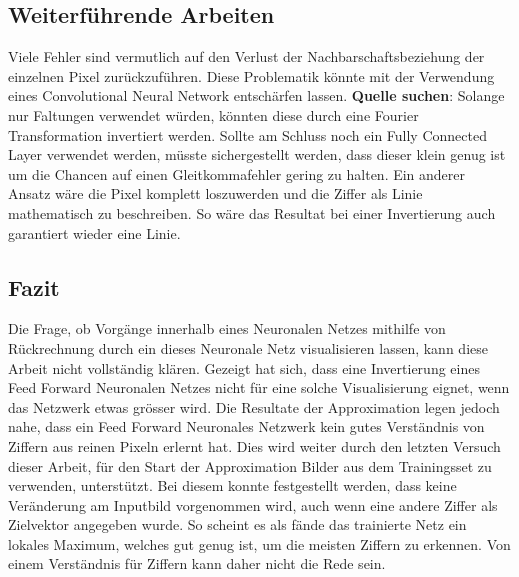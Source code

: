 \documentclass[Interploate_hadwritten_Digits.tex]{subfiles}
\begin{document}
	\subsection{Weiterführende Arbeiten}
	Viele Fehler sind vermutlich auf den Verlust der Nachbarschaftsbeziehung der einzelnen Pixel zurückzuführen. Diese Problematik könnte mit der Verwendung eines Convolutional Neural Network entschärfen lassen. \textbf{Quelle suchen}: Solange nur Faltungen verwendet würden, könnten diese durch eine Fourier Transformation invertiert werden. Sollte am Schluss noch ein Fully Connected Layer verwendet werden, müsste sichergestellt werden, dass dieser klein genug ist um die Chancen auf einen Gleitkommafehler gering zu halten.
	Ein anderer Ansatz wäre die Pixel komplett loszuwerden und die Ziffer als Linie mathematisch zu beschreiben. So wäre das Resultat bei einer Invertierung auch garantiert wieder eine Linie.
	
	\subsection{Fazit}
	Die Frage, ob Vorgänge innerhalb eines Neuronalen Netzes mithilfe von Rückrechnung durch ein dieses Neuronale Netz visualisieren lassen, kann diese Arbeit nicht vollständig klären. Gezeigt hat sich, dass eine Invertierung eines Feed Forward Neuronalen Netzes nicht für eine solche Visualisierung eignet, wenn das Netzwerk etwas grösser wird. Die Resultate der Approximation legen jedoch nahe, dass ein Feed Forward Neuronales Netzwerk kein gutes Verständnis von Ziffern aus reinen Pixeln erlernt hat. Dies wird weiter durch den letzten Versuch dieser Arbeit, für den Start der Approximation Bilder aus dem Trainingsset zu verwenden, unterstützt. Bei diesem konnte festgestellt werden, dass keine Veränderung am Inputbild vorgenommen wird, auch wenn eine andere Ziffer als Zielvektor angegeben wurde. So scheint es als fände das trainierte Netz ein lokales Maximum, welches gut genug ist, um die meisten Ziffern zu erkennen. Von einem Verständnis für Ziffern kann daher nicht die Rede sein.
	
\end{document}
